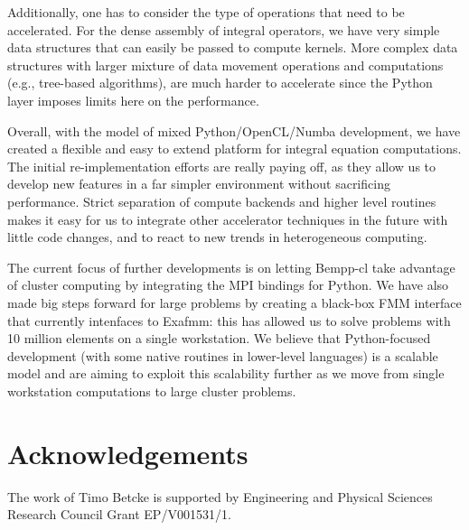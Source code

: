 Additionally, one has to consider the type of operations that need to be accelerated. For the dense assembly of integral operators, we have very simple data structures that can easily be passed to compute kernels. More complex data structures with larger mixture of data movement operations and computations (e.g., tree-based algorithms), are much harder to accelerate since the Python layer imposes limits here on the performance.

Overall, with the model of mixed Python/OpenCL/Numba development, we have created a flexible and easy to extend platform for integral equation computations. The initial re-implementation efforts are really paying off, as they allow us to develop new features in a far simpler environment without sacrificing performance. Strict separation of compute backends and higher level routines makes it easy for us to integrate other accelerator techniques in the future with little code changes, and to react to new trends in heterogeneous computing.

The current focus of further developments is on letting Bempp-cl take advantage of cluster computing by integrating the  MPI bindings for Python. We have also made big steps forward for large problems by creating a black-box FMM interface that currently intenfaces to Exafmm: this has allowed us to solve problems with 10 million elements on a single workstation. We believe that Python-focused development (with some native routines in lower-level languages) is a scalable model and are aiming to exploit this scalability further as we move from single workstation computations to large cluster problems.

\section{Acknowledgements}
The work of Timo Betcke is supported by Engineering and Physical Sciences Research Council Grant EP/V001531/1.
